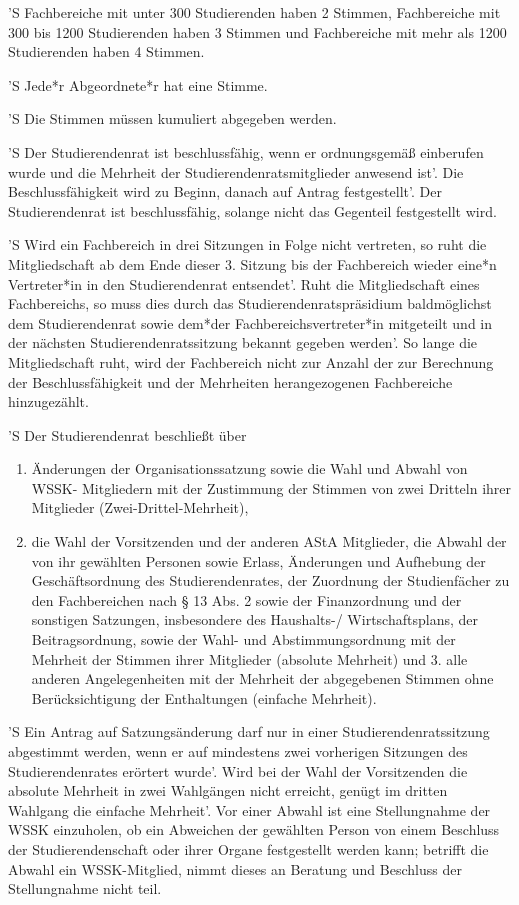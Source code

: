 \documentclass[fontsize=12pt,parskip=half]{scrartcl}
\begin{document}
\begin{contract}
  'S Fachbereiche mit unter 300 Studierenden haben 2 Stimmen, Fachbereiche mit 300
  bis 1200 Studierenden haben 3 Stimmen und Fachbereiche mit mehr als 1200
  Studierenden haben 4 Stimmen.

  'S Jede*r Abgeordnete*r hat eine Stimme.

  'S Die Stimmen müssen kumuliert abgegeben werden.



  'S Der Studierendenrat ist beschlussfähig, wenn er ordnungsgemäß einberufen wurde
  und die Mehrheit der Studierendenratsmitglieder anwesend ist'. Die
  Beschlussfähigkeit wird zu Beginn, danach auf Antrag festgestellt'. Der
  Studierendenrat ist beschlussfähig, solange nicht das Gegenteil festgestellt
  wird.

  'S Wird ein Fachbereich in drei Sitzungen in Folge nicht vertreten, so ruht die
  Mitgliedschaft ab dem Ende dieser 3. Sitzung bis der Fachbereich wieder eine*n
  Vertreter*in in den Studierendenrat entsendet'. Ruht die Mitgliedschaft eines
  Fachbereichs, so muss dies durch das Studierendenratspräsidium baldmöglichst
  dem Studierendenrat sowie dem*der Fachbereichsvertreter*in mitgeteilt und in
  der nächsten Studierendenratssitzung bekannt gegeben werden'. So lange die
  Mitgliedschaft ruht, wird der Fachbereich nicht zur Anzahl der zur Berechnung
  der Beschlussfähigkeit und der Mehrheiten herangezogenen Fachbereiche
  hinzugezählt.

  'S Der Studierendenrat beschließt über
  \begin{enumerate}[\qquad 1.]
    \item Änderungen der Organisationssatzung sowie die Wahl und Abwahl von
      WSSK- Mitgliedern mit der Zustimmung der Stimmen von zwei Dritteln ihrer
      Mitglieder (Zwei-Drittel-Mehrheit),
    \item die Wahl der Vorsitzenden und der anderen AStA Mitglieder, die Abwahl
      der von ihr gewählten Personen sowie Erlass, Änderungen und Aufhebung der
      Geschäftsordnung des Studierendenrates, der Zuordnung der Studienfächer zu
      den Fachbereichen nach § 13 Abs. 2 sowie der Finanzordnung und der
      sonstigen Satzungen, insbesondere des Haushalts-/ Wirtschaftsplans, der
      Beitragsordnung, sowie der Wahl- und Abstimmungsordnung mit der Mehrheit
      der Stimmen ihrer Mitglieder (absolute Mehrheit) und 3. alle anderen
      Angelegenheiten mit der Mehrheit der abgegebenen Stimmen ohne
      Berücksichtigung der Enthaltungen (einfache Mehrheit).
  \end{enumerate}
  'S Ein Antrag auf Satzungsänderung darf nur in einer Studierendenratssitzung
  abgestimmt werden, wenn er auf mindestens zwei vorherigen Sitzungen des
  Studierendenrates erörtert wurde'. Wird bei der Wahl der Vorsitzenden die
  absolute Mehrheit in zwei Wahlgängen nicht erreicht, genügt im dritten
  Wahlgang die einfache Mehrheit'. Vor einer Abwahl ist eine Stellungnahme der
  WSSK einzuholen, ob ein Abweichen der gewählten Person von einem Beschluss der
  Studierendenschaft oder ihrer Organe festgestellt werden kann; betrifft die
  Abwahl ein WSSK-Mitglied, nimmt dieses an Beratung und Beschluss der
  Stellungnahme nicht teil.


\end{contract}
\end{document}

